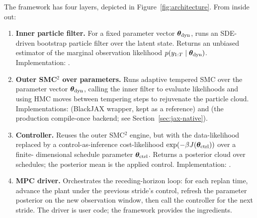 The framework has four layers, depicted in
Figure~\ref{fig:architecture}. From inside out:

\begin{enumerate}
  \item \textbf{Inner particle filter.} For a fixed parameter vector
        $\bm{\theta}_{\rm dyn}$, runs an SDE-driven bootstrap particle filter over
        the latent state. Returns an unbiased estimator of the marginal
        observation likelihood $p(y_{1:T} \mid \bm{\theta}_{\rm dyn})$.
        Implementation: .
  \item \textbf{Outer SMC$^2$ over parameters.} Runs adaptive tempered
        SMC over the parameter vector $\bm{\theta}_{\rm dyn}$, calling the inner
        filter to evaluate likelihoods and using HMC moves between
        tempering steps to rejuvenate the particle cloud.
        Implementations:  (BlackJAX
        wrapper, kept as a reference) and
         (the production
        compile-once backend; see Section~\ref{sec:jax-native}).
  \item \textbf{Controller.} Reuses the outer SMC$^2$ engine, but with
        the data-likelihood replaced by a control-as-inference
        cost-likelihood $\exp(-\beta J(\bm{\theta}_{\rm ctrl}))$ over a finite-
        dimensional schedule parameter $\bm{\theta}_{\rm ctrl}$. Returns a
        posterior cloud over schedules; the posterior mean is the
        applied control. Implementation: .
  \item \textbf{MPC driver.} Orchestrates the receding-horizon loop:
        for each replan time, advance the plant under the previous
        stride's control, refresh the parameter posterior on the new
        observation window, then call the controller for the next
        stride. The driver is user code; the framework provides the
        ingredients.
\end{enumerate}

